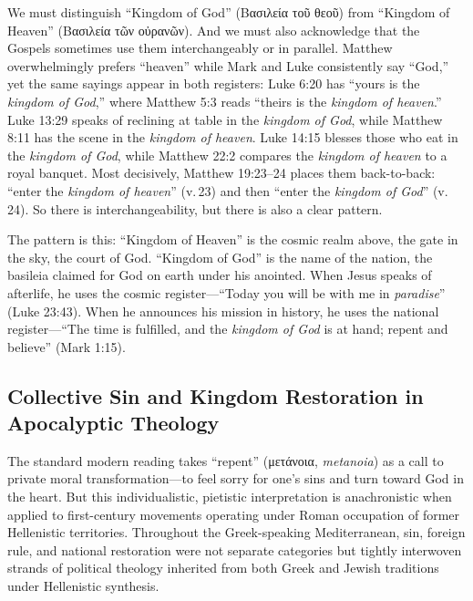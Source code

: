 We must distinguish ``Kingdom of God'' (Βασιλεία τοῦ θεοῦ) from ``Kingdom of Heaven'' (Βασιλεία τῶν οὐρανῶν).
And we must also acknowledge that the Gospels sometimes use them interchangeably or in parallel.
Matthew overwhelmingly prefers ``heaven'' while Mark and Luke consistently say ``God,'' yet the same sayings appear in both registers:
Luke 6:20 has ``yours is the \emph{kingdom of God},'' where Matthew 5:3 reads ``theirs is the \emph{kingdom of heaven}.''
Luke 13:29 speaks of reclining at table in the \emph{kingdom of God}, while Matthew 8:11 has the scene in the \emph{kingdom of heaven}.
Luke 14:15 blesses those who eat in the \emph{kingdom of God}, while Matthew 22:2 compares the \emph{kingdom of heaven} to a royal banquet.
Most decisively, Matthew 19:23--24 places them back-to-back: ``enter the \emph{kingdom of heaven}'' (v.\,23) and then ``enter the \emph{kingdom of God}'' (v.\,24).
So there is interchangeability, but there is also a clear pattern.

The pattern is this: ``Kingdom of Heaven'' is the cosmic realm above, the gate in the sky, the court of God.
``Kingdom of God'' is the name of the nation, the basileia claimed for God on earth under his anointed.
When Jesus speaks of afterlife, he uses the cosmic register---``Today you will be with me in \emph{paradise}'' (Luke 23:43).
When he announces his mission in history, he uses the national register---``The time is fulfilled, and the \emph{kingdom of God} is at hand; repent and believe'' (Mark 1:15).

\subsection{Collective Sin and Kingdom Restoration in Apocalyptic Theology}\label{subsec:collective-sin-and-kingdom-restoration}

The standard modern reading takes ``repent'' (μετάνοια, \textit{metanoia}) as a call to private moral transformation---to feel sorry for one's sins and turn toward God in the heart.
But this individualistic, pietistic interpretation is anachronistic when applied to first-century movements operating under Roman occupation of former Hellenistic territories.
Throughout the Greek-speaking Mediterranean, sin, foreign rule, and national restoration were not separate categories but tightly interwoven strands of political theology inherited from both Greek and Jewish traditions under Hellenistic synthesis.

